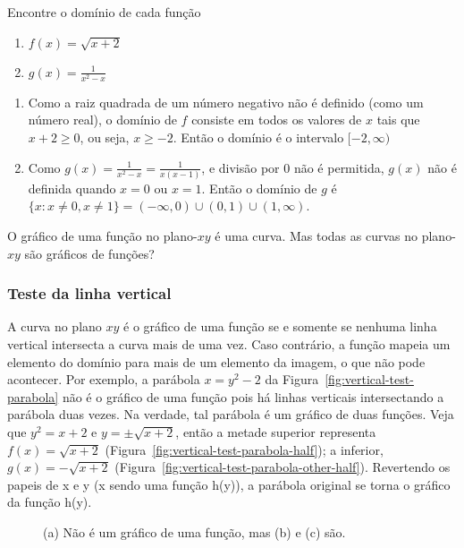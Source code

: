 \exampleEnd
{} Encontre o domínio de cada função
\vspace{-0.3cm}\begin{multicols}{2}
  \begin{enumerate}[label=(\alph*)]
    \item $\displaystyle f(x) = \sqrt{x+2}$
    \item $\displaystyle g(x)=\frac{1}{x^2-x}$
  \end{enumerate}
\end{multicols}
\vspace{-0.3cm}\solution 
\begin{enumerate}[label=(\alph*)]
  \item Como a raiz quadrada de um número negativo não é definido (como um número real), o domínio de $f$ consiste em todos os valores de $x$ tais que $x+2 \geq 0$, ou seja, $x \geq -2$. Então o domínio é o intervalo $[-2,\infty)$
  \item Como $\displaystyle g(x)=\frac{1}{x^2-x}=\frac{1}{x(x-1)}$, e divisão por 0 não é permitida, $g(x)$ não é definida quando $x=0$ ou $x=1$. Então o domínio de $g$ é $\{x:x\neq 0, x\neq 1\}=(-\infty,0)\cup(0,1)\cup(1,\infty)$.
\end{enumerate}
\vspace{-0.2cm}
\exampleEnd
O gráfico de uma função no plano-$xy$ é uma curva. Mas todas as curvas no plano-$xy$ são gráficos de funções?
\vspace{-0.3cm}
\subsubsection{Teste da linha vertical}

A curva no plano $xy$ é o gráfico de uma função se e somente se nenhuma linha vertical intersecta a curva mais de uma vez. Caso contrário, a função mapeia um elemento do domínio para mais de um elemento da imagem, o que não pode acontecer. Por exemplo, a parábola $x = y^2-2$ da Figura~\ref{fig:vertical-test-parabola} não é o gráfico de uma função pois há linhas verticais intersectando a parábola duas vezes. Na verdade, tal parábola é um gráfico de duas funções. Veja que $y^2=x+2$ e $y=\pm\sqrt{x+2}$, então a metade superior representa $f(x) = \sqrt{x+2}$ (Figura~\ref{fig:vertical-test-parabola-half}); a inferior, $g(x)=-\sqrt{x+2}$ (Figura~\ref{fig:vertical-test-parabola-other-half}). Revertendo os papeis de x e y (x sendo uma função h(y)), a parábola original se torna o gráfico da função h(y).
\vspace{-0.6cm}\begin{figure}[!ht]
	\centering
	\caption{(a) Não é um gráfico de uma função, mas (b) e (c) são.}
  \vspace{-0.5cm}
\end{figure}

